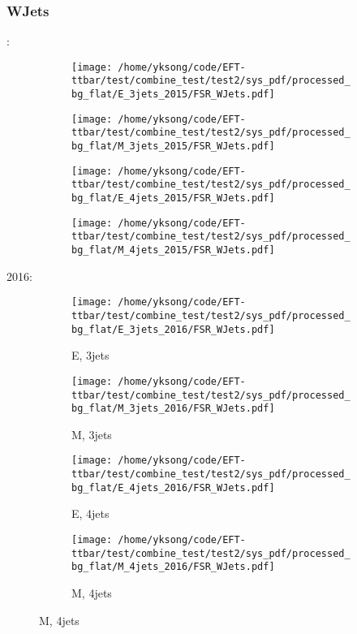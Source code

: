 \documentclass{beamer}
\begin{document}
\begin{frame}
\frametitle{WJets}
\fontsize{5}{1}:
\begin{figure}
\centering
\begin{subfigure}[b]{0.24\textwidth}
\texttt{[image: /home/yksong/code/EFT-ttbar/test/combine\_test/test2/sys\_pdf/processed\_bg\_flat/E\_3jets\_2015/FSR\_WJets.pdf]}
\end{subfigure}
\begin{subfigure}[b]{0.24\textwidth}
\texttt{[image: /home/yksong/code/EFT-ttbar/test/combine\_test/test2/sys\_pdf/processed\_bg\_flat/M\_3jets\_2015/FSR\_WJets.pdf]}
\end{subfigure}
\begin{subfigure}[b]{0.24\textwidth}
\texttt{[image: /home/yksong/code/EFT-ttbar/test/combine\_test/test2/sys\_pdf/processed\_bg\_flat/E\_4jets\_2015/FSR\_WJets.pdf]}
\end{subfigure}
\begin{subfigure}[b]{0.24\textwidth}
\texttt{[image: /home/yksong/code/EFT-ttbar/test/combine\_test/test2/sys\_pdf/processed\_bg\_flat/M\_4jets\_2015/FSR\_WJets.pdf]}
\end{subfigure}
\end{figure}
2016:
\begin{figure}
\centering
\begin{subfigure}[b]{0.24\textwidth}
\texttt{[image: /home/yksong/code/EFT-ttbar/test/combine\_test/test2/sys\_pdf/processed\_bg\_flat/E\_3jets\_2016/FSR\_WJets.pdf]}
\captionsetup{font=tiny}
\caption{E, 3jets}
\end{subfigure}
\begin{subfigure}[b]{0.24\textwidth}
\texttt{[image: /home/yksong/code/EFT-ttbar/test/combine\_test/test2/sys\_pdf/processed\_bg\_flat/M\_3jets\_2016/FSR\_WJets.pdf]}
\captionsetup{font=tiny}
\caption{M, 3jets}
\end{subfigure}
\begin{subfigure}[b]{0.24\textwidth}
\texttt{[image: /home/yksong/code/EFT-ttbar/test/combine\_test/test2/sys\_pdf/processed\_bg\_flat/E\_4jets\_2016/FSR\_WJets.pdf]}
\captionsetup{font=tiny}
\caption{E, 4jets}
\end{subfigure}
\begin{subfigure}[b]{0.24\textwidth}
\texttt{[image: /home/yksong/code/EFT-ttbar/test/combine\_test/test2/sys\_pdf/processed\_bg\_flat/M\_4jets\_2016/FSR\_WJets.pdf]}
\captionsetup{font=tiny}
\caption{M, 4jets}
\end{subfigure}
\end{figure}
\end{frame}
\end{document}

